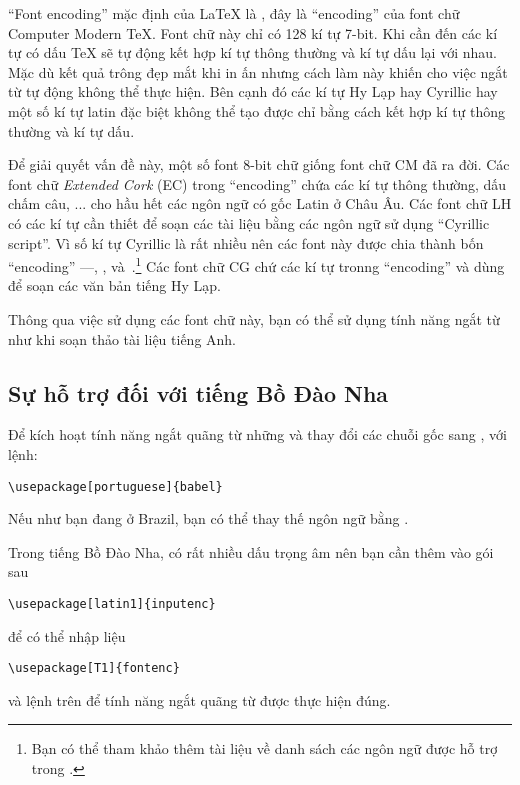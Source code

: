 ``Font encoding'' mặc định của \LaTeX{} là \label{OT1} , đây là ``encoding'' của font chữ Computer Modern \TeX{}. Font chữ này chỉ có 128 kí tự 7-bit. Khi cần đến các kí tự có dấu \TeX{} sẽ tự động kết hợp kí tự thông thường và kí tự dấu lại với nhau. Mặc dù kết quả trông đẹp mắt khi in ấn nhưng cách làm này khiến cho việc ngắt từ tự động không thể thực hiện. Bên cạnh đó các kí tự Hy Lạp hay Cyrillic hay một số kí tự latin đặc biệt không thể tạo được chỉ bằng cách kết hợp kí tự thông thường và kí tự dấu.

Để giải quyết vấn đề này, một số font 8-bit chữ giống font chữ CM đã ra đời. Các font chữ \emph{Extended Cork} (EC) trong ``encoding''  chứa các kí tự thông thường, dấu chấm câu, ... cho hầu hết các ngôn ngữ có gốc Latin ở Châu Âu. Các font chữ LH có các kí tự cần thiết để soạn các tài liệu bằng các ngôn ngữ sử dụng ``Cyrillic script''. Vì số kí tự Cyrillic là rất nhiều nên các font này được chia thành bốn ``encoding'' ---, ,  và~.\footnote{Bạn có thể tham khảo thêm tài liệu về danh sách các ngôn ngữ được hỗ trợ trong \cite{cyrguide}.} Các font chữ CG chứ các kí tự tronng  ``encoding'' và dùng để soạn các văn bản tiếng Hy Lạp.

Thông qua việc sử dụng các font chữ này, bạn có thể sử dụng tính năng ngắt từ như khi soạn thảo tài liệu tiếng Anh.

\subsection{Sự hỗ trợ đối với tiếng Bồ Đào Nha}

Để kích hoạt tính năng ngắt quãng từ những và thay đổi các chuỗi
gốc sang , với lệnh:
\begin{lscommand}
\verb|\usepackage[portuguese]{babel}|
\end{lscommand}
Nếu như bạn đang ở Brazil, bạn có thể thay thế ngôn ngữ bằng
.

Trong tiếng Bồ Đào Nha, có rất nhiều dấu trọng âm nên bạn cần thêm
vào gói sau

\begin{lscommand}
\verb|\usepackage[latin1]{inputenc}|
\end{lscommand}
để có thể nhập liệu
\begin{lscommand}
\verb|\usepackage[T1]{fontenc}|
\end{lscommand}
và lệnh trên để tính năng ngắt quãng từ được thực hiện đúng.

